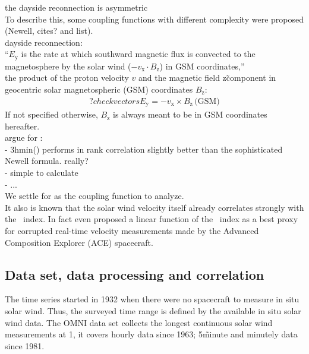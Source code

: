 the dayside reconnection is asymmetric\\

To describe this, some coupling functions with different complexity were proposed (Newell, cites? and list).\\

dayside reconnection:\\
``$E_\text{y}$ is the rate at which southward magnetic flux is convected to the magnetosphere by the solar wind ($-v_\text{x} \cdot B_\text{z}$) in GSM coordinates,'' \citep{Russell2007}\\

the product of the proton velocity $v$ and the magnetic field z\~component in geocentric solar magnetospheric (GSM) coordinates $B_\text{z}$:
\begin{align}
	?check vectors  E_\text{y} = -v_\text{x} \times B_\text{z}\,\text{(GSM)}	\label{eq:coupling_vxB}
\end{align}
If not specified otherwise, $B_\text{z}$ is always meant to be in GSM coordinates hereafter.\\

argue for \vBz:\\
- 3hmin(\vBz) performs in rank correlation slightly better than the sophisticated Newell formula. really?\\
- simple to calculate\\
- ...\\

We settle for \vBz{} as the coupling function to analyze.\\

It also is known that the solar wind velocity itself already correlates strongly with the \Kp~index. In fact \citet{Machol2013} even proposed a linear function of the \Kp~index as a best proxy for corrupted real-time velocity measurements made by the Advanced Composition Explorer (ACE) spacecraft.\\

\subsection{Data set, data processing and correlation}
\label{sec:data_set__data_processing_and_correlation}
The \Kp{} time series started in 1932 when there were no spacecraft to measure in situ solar wind. Thus, the surveyed time range is defined by the available in situ solar wind data. The OMNI data set collects the longest continuous solar wind measurements at \SI{1}{\au},
it covers hourly data since 1963; 5\~minute and minutely data since 1981.\\

